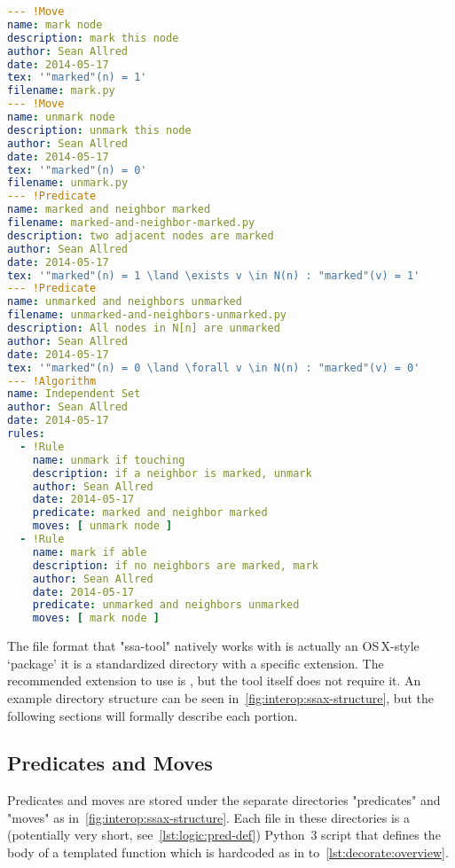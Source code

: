 \begin{lstlisting}[float=p, language=yaml, basicstyle=\ttfamily\footnotesize, caption={\directory{bundle.yaml}}, label={lst:interop:yaml-alg}]
--- !Move
name: mark node
description: mark this node
author: Sean Allred
date: 2014-05-17
tex: '"marked"(n) = 1'
filename: mark.py
--- !Move
name: unmark node
description: unmark this node
author: Sean Allred
date: 2014-05-17
tex: '"marked"(n) = 0'
filename: unmark.py
--- !Predicate
name: marked and neighbor marked
filename: marked-and-neighbor-marked.py
description: two adjacent nodes are marked
author: Sean Allred
date: 2014-05-17
tex: '"marked"(n) = 1 \land \exists v \in N(n) : "marked"(v) = 1'
--- !Predicate
name: unmarked and neighbors unmarked
filename: unmarked-and-neighbors-unmarked.py
description: All nodes in N[n] are unmarked
author: Sean Allred
date: 2014-05-17
tex: '"marked"(n) = 0 \land \forall v \in N(n) : "marked"(v) = 0'
--- !Algorithm
name: Independent Set
author: Sean Allred
date: 2014-05-17
rules:
  - !Rule
    name: unmark if touching
    description: if a neighbor is marked, unmark
    author: Sean Allred
    date: 2014-05-17
    predicate: marked and neighbor marked
    moves: [ unmark node ]
  - !Rule
    name: mark if able
    description: if no neighbors are marked, mark
    author: Sean Allred
    date: 2014-05-17
    predicate: unmarked and neighbors unmarked
    moves: [ mark node ]
\end{lstlisting}

The file format that "ssa-tool" natively works with
  is actually an OS\,X-style \enquote*{package} \Dash 
  it is a standardized directory with a specific extension.
The recommended extension to use is ,
  but the tool itself does not require it.
An example directory structure can be seen in~\autoref{fig:interop:ssax-structure},
  but the following sections will formally describe each portion.

\subsection{Predicates and Moves}
\label{sec:bundle:predicates-moves}

Predicates and moves are stored under the
  separate directories "predicates" and "moves" as in~\autoref{fig:interop:ssax-structure}.
Each file in these directories is a
  (potentially very short, see~\autoref{lst:logic:pred-def}) Python~3 script
  that defines the body of a templated function
  which is hardcoded as in to~\autoref{lst:decorate:overview}.

